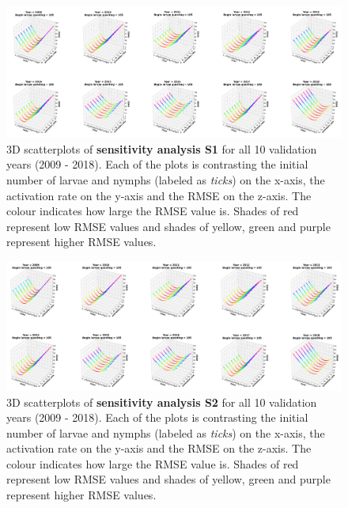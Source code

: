 \documentclass[a4paper, 11pt]{scrartcl}
\begin{document}
\begin{figure}
\centering
\includegraphics[width=\linewidth]{figures/initial_ticks_with_beech_error.png}
\caption{3D scatterplots of \textbf{sensitivity analysis S1} for all 10 validation years (2009 - 2018). Each of the plots is contrasting the initial number of larvae and nymphs
(labeled as \textit{ticks}) on the x-axis, the activation rate on the y-axis and the RMSE on the z-axis. The colour indicates how large the RMSE value is. Shades of
red represent low RMSE values and shades of yellow, green and purple represent higher RMSE values.}
\label{fig:initial_ticks_with_beech_error_rotated}
\end{figure}

\begin{figure}
\centering
\includegraphics[width=\linewidth]{figures/initial_ticks_without_beech_error.png}
\caption{3D scatterplots of \textbf{sensitivity analysis S2} for all 10 validation years (2009 - 2018). Each of the plots is contrasting the initial number of larvae and nymphs
(labeled as \textit{ticks}) on the x-axis, the activation rate on the y-axis and the RMSE on the z-axis. The colour indicates how large the RMSE value is. Shades of red
represent low RMSE values and shades of yellow, green and purple represent higher RMSE values.}
\label{fig:initial_ticks_without_beech_error_rotated}
\end{figure}
\end{document}
